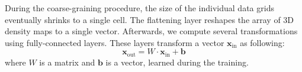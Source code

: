 
During the coarse-graining procedure, the size of the individual data
grids eventually shrinks to a single cell. The flattening layer
reshapes the array of 3D density maps to a single vector. Afterwards,
we compute several transformations using fully-connected layers. These
layers transform a vector $\mathbf{x}_\text{in}$ as following:
$$
\mathbf{x}_\text{out} = W \cdot \mathbf{x}_\text{in} + \mathbf{b}
$$
where $W$ is a matrix and $\mathbf{b}$ is a vector, learned during the
training.
